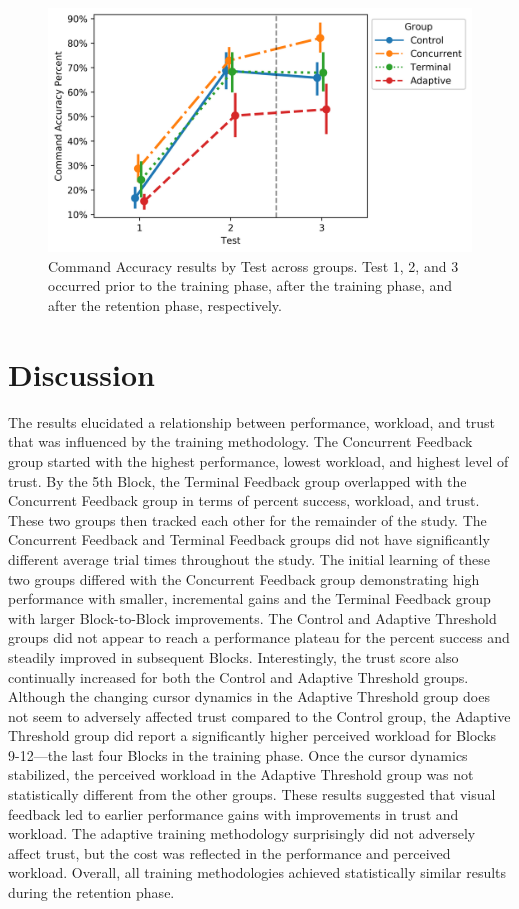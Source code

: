 \begin{figure}[bt!]
	\centering
	\includegraphics[height=.4\textwidth]{figures/EMG/CodeAccuracySuccess_session}
	\caption[Command Accuracy results by Test across groups]{Command Accuracy results by Test across groups.
		Test 1, 2, and 3 occurred prior to the training phase, after the training phase, and after the retention phase, respectively.}
	\label{figure:label7}
\end{figure}

\section{Discussion}
The results elucidated a relationship between performance, workload, and trust that was influenced by the training methodology.
The Concurrent Feedback group started with the highest performance, lowest workload, and highest level of trust.
By the 5th Block, the Terminal Feedback group overlapped with the Concurrent Feedback group in terms of percent success, workload, and trust.
These two groups then tracked each other for the remainder of the study.
The Concurrent Feedback and Terminal Feedback groups did not have significantly different average trial times throughout the study.
The initial learning of these two groups differed with the Concurrent Feedback group demonstrating high performance with smaller, incremental gains and the Terminal Feedback group with larger Block-to-Block improvements.
The Control and Adaptive Threshold groups did not appear to reach a performance plateau for the percent success and steadily improved in subsequent Blocks.
Interestingly, the trust score also continually increased for both the Control and Adaptive Threshold groups.
Although the changing cursor dynamics in the Adaptive Threshold group does not seem to adversely affected trust compared to the Control group, the Adaptive Threshold group did report a significantly higher perceived workload for Blocks 9-12---the last four Blocks in the training phase.
Once the cursor dynamics stabilized, the perceived workload in the Adaptive Threshold group was not statistically different from the other groups.
These results suggested that visual feedback led to earlier performance gains with improvements in trust and workload.
The adaptive training methodology surprisingly did not adversely affect trust, but the cost was reflected in the performance and perceived workload.
Overall, all training methodologies achieved statistically similar results during the retention phase.

